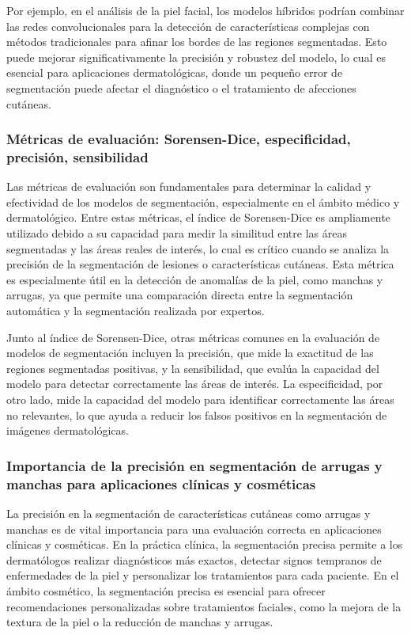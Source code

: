 Por ejemplo, en el análisis de la piel facial, los modelos híbridos podrían combinar las redes convolucionales para la detección de características complejas con métodos tradicionales para afinar los bordes de las regiones segmentadas. Esto puede mejorar significativamente la precisión y robustez del modelo, lo cual es esencial para aplicaciones dermatológicas, donde un pequeño error de segmentación puede afectar el diagnóstico o el tratamiento de afecciones cutáneas. \parencite{hussain2021}

\subsubsection{Métricas de evaluación: Sorensen-Dice, especificidad, precisión, sensibilidad}
Las métricas de evaluación son fundamentales para determinar la calidad y efectividad de los modelos de segmentación, especialmente en el ámbito médico y dermatológico. Entre estas métricas, el índice de Sorensen-Dice es ampliamente utilizado debido a su capacidad para medir la similitud entre las áreas segmentadas y las áreas reales de interés, lo cual es crítico cuando se analiza la precisión de la segmentación de lesiones o características cutáneas. Esta métrica es especialmente útil en la detección de anomalías de la piel, como manchas y arrugas, ya que permite una comparación directa entre la segmentación automática y la segmentación realizada por expertos.

Junto al índice de Sorensen-Dice, otras métricas comunes en la evaluación de modelos de segmentación incluyen la precisión, que mide la exactitud de las regiones segmentadas positivas, y la sensibilidad, que evalúa la capacidad del modelo para detectar correctamente las áreas de interés. La especificidad, por otro lado, mide la capacidad del modelo para identificar correctamente las áreas no relevantes, lo que ayuda a reducir los falsos positivos en la segmentación de imágenes dermatológicas. \parencite{sorensen1948}

\subsubsection{Importancia de la precisión en segmentación de arrugas y manchas para aplicaciones clínicas y cosméticas}
La precisión en la segmentación de características cutáneas como arrugas y manchas es de vital importancia para una evaluación correcta en aplicaciones clínicas y cosméticas. En la práctica clínica, la segmentación precisa permite a los dermatólogos realizar diagnósticos más exactos, detectar signos tempranos de enfermedades de la piel y personalizar los tratamientos para cada paciente. En el ámbito cosmético, la segmentación precisa es esencial para ofrecer recomendaciones personalizadas sobre tratamientos faciales, como la mejora de la textura de la piel o la reducción de manchas y arrugas.

